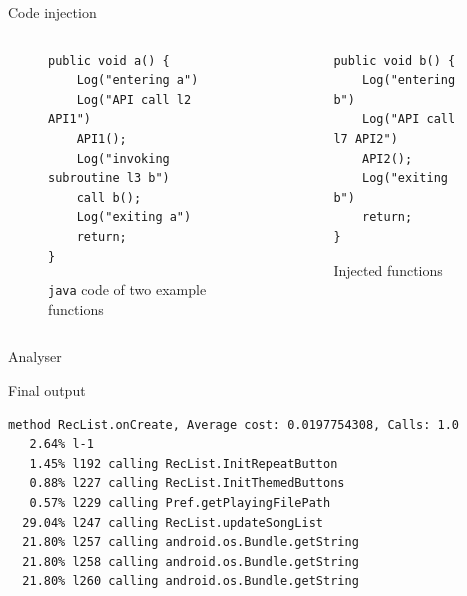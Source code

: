 \begin{frame}[fragile]{Code injection}
\begin{columns}
\begin{column}{0.5\textwidth}
\begin{figure}%
\centering
\begin{lstlisting}
public void a() {
	Log("entering a")
	Log("API call l2 API1")
	API1();
	Log("invoking subroutine l3 b")
	call b();
	Log("exiting a")
	return;
}
\end{lstlisting}
\caption{\texttt{java} code of two example functions}
\end{figure}
\end{column}
%
\begin{column}{0.5\textwidth}
\begin{figure}
\centering
\begin{lstlisting}
public void b() {
	Log("entering b")
	Log("API call l7 API2")
	API2();
	Log("exiting b")
	return;
}
\end{lstlisting}
\caption{Injected functions}
\end{figure}
\end{column}
\end{columns}
\end{frame} 
%
%
\begin{frame}{Analyser} %
 
\end{frame}  
 
\begin{frame}[fragile]{Final output}
\centering
{\tiny%
\begin{lstlisting}
method RecList.onCreate, Average cost: 0.0197754308, Calls: 1.0
   2.64% l-1
   1.45% l192 calling RecList.InitRepeatButton
   0.88% l227 calling RecList.InitThemedButtons
   0.57% l229 calling Pref.getPlayingFilePath
  29.04% l247 calling RecList.updateSongList
  21.80% l257 calling android.os.Bundle.getString
  21.80% l258 calling android.os.Bundle.getString
  21.80% l260 calling android.os.Bundle.getString
\end{lstlisting}}
\end{frame}
%
%
